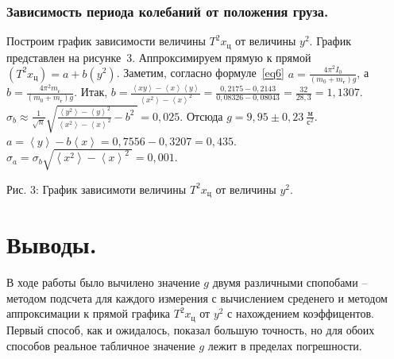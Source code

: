 \documentclass[a4paper,11pt]{article}
\begin{document}
\subsubsection{Зависимость периода колебаний от положения груза.}
Построим график зависимости величины $T^{2}x_{ц}$ от величины $y^{2}$. График представлен на рисунке~3. Аппроксимируем прямую к прямой $(T^{2}x_{ц}) = a + b(y^{2})$. Заметим, согласно формуле~\ref{eq6} $a = \frac{4\pi^{2} I_{0}}{(m_{0} + m_{г})g}$, а $b = \frac{4\pi^{2}m_{г}}{(m_{0} + m_{г})g}$.\newline
Итак, $b = \frac{\left<xy\right> - \left<x\right>\left<y\right>}{\left<x^{2}\right> - \left<x\right>^{2}} = \frac{0,2175 - 0,2143}{0,08326 - 0,08043} = \frac{32}{28,3} = 1,1307$.\newline
$\sigma_{b} \approx \frac{1}{\sqrt{n}}\sqrt{\frac{\left<y^{2}\right> - \left<y\right>^{2}}{\left<x^{2}\right> - \left<x\right>^{2}} - b^{2}\ } = 0,025$.\newline
Отсюда $g = 9,95 \pm 0,23\ \frac{м}{с^{2}}$.\newline
$a = \left<y\right> - b\left<x\right> = 0,7556 - 0,3207 = 0,435$.\newline
$\sigma_{a} = \sigma_{b}\sqrt{\left<x^{2}\right> - \left<x\right>^{2}\ } = 0,001$.
\begin{center}
\newline
Рис. 3: График зависимоти величины $T^{2}x_{ц}$ от величины $y^{2}$.\newline
\end{center}
\section{Выводы.}
В ходе работы было вычилено значение $g$ двумя различными спопобами -- методом подсчета для каждого измерения с вычислением среденего и методом аппроксимации к прямой графика $T^{2}x_{ц}$ от $y^{2}$ с нахождением коэффицентов. Первый способ, как и ожидалось, показал большую точность, но для обоих способов реальное табличное значение $g$ лежит в пределах погрешности.
\end{document}
